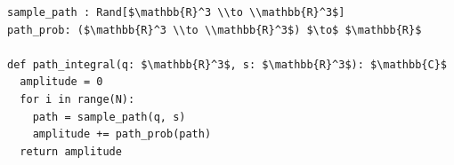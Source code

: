 \documentclass[border=10pt]{standalone}
\begin{document}
\begin{lstlisting}
sample_path : Rand[$\mathbb{R}^3 \\to \\mathbb{R}^3$]
path_prob: ($\mathbb{R}^3 \\to \\mathbb{R}^3$) $\to$ $\mathbb{R}$

def path_integral(q: $\mathbb{R}^3$, s: $\mathbb{R}^3$): $\mathbb{C}$
  amplitude = 0
  for i in range(N):
    path = sample_path(q, s)
    amplitude += path_prob(path)
  return amplitude
\end{lstlisting}
\end{document}
